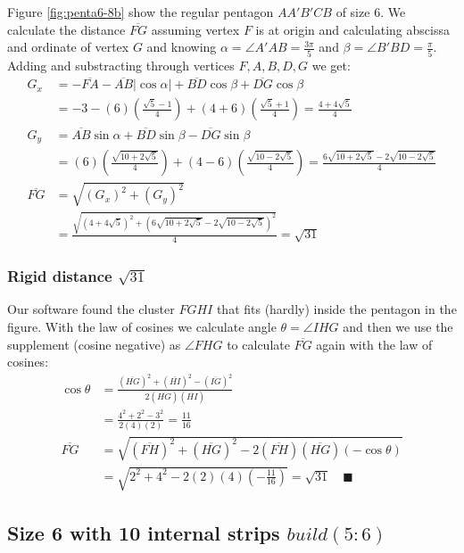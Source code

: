 \documentclass[11pt]{article}
\begin{document}
Figure \ref{fig:penta6-8b} show the regular pentagon $AA'B'CB$ of size $6$. We calculate the distance $\overline{FG}$ assuming vertex $F$ is at origin and calculating abscissa and ordinate of vertex $G$ and knowing $\alpha = \angle{A'AB} = \frac{3\pi}5$ and $\beta = \angle{B'BD} = \frac{\pi}5$. Adding and substracting through vertices $F,A,B,D,G$ we get:
\begin{align}
G_x &= -\overline{FA} -\overline{AB}|\cos\alpha| + \overline{BD}\cos\beta + \overline{DG}\cos\beta \nonumber\\
 &= -3 -(6)\left(\frac{\sqrt5 - 1}4\right) + (4+6)\left(\frac{\sqrt5+1}4\right)
 = \frac{4 + 4\sqrt5}4 \\
G_y &= \overline{AB}\sin\alpha + \overline{BD}\sin\beta - \overline{DG}\sin\beta \nonumber\\
 &= (6)\left(\frac{\sqrt{10+2\sqrt5}}4\right) + (4-6)\left(\frac{\sqrt{10-2\sqrt5}}4\right)
 = \frac{6\sqrt{10+2\sqrt5} - 2\sqrt{10-2\sqrt5}}4 \\
%
\overline{FG} &= \sqrt{(G_x)^2 + (G_y)^2} \nonumber\\
 &= \frac{\sqrt{(4+4\sqrt5)^2 + (6\sqrt{10+2\sqrt5} -2\sqrt{10-2\sqrt5})^2}}4
 = \sqrt{31}
\end{align}

\subsubsection{Rigid distance $\sqrt{31}$}

Our software found the cluster $FGHI$ that fits (hardly) inside the pentagon in the figure.
With the law of cosines we calculate angle $\theta = \angle{IHG}$ and then we use the supplement (cosine negative) as $\angle{FHG}$ to calculate $\overline{FG}$ again with the law of cosines:
\begin{align}
\cos\theta &= \frac{(\overline{HG})^2 + (\overline{HI})^2 - (\overline{IG})^2}
 {2(\overline{HG})(\overline{HI})} \nonumber\\
 &= \frac{4^2 + 2^2 - 3^2}{2(4)(2)} = \frac{11}{16} \\
\overline{FG} &= \sqrt{(\overline{FH})^2 + (\overline{HG})^2 
 - 2(\overline{FH})(\overline{HG})(-\cos\theta) } \nonumber\\
 &= \sqrt{2^2 + 4^2 - 2(2)(4)\left(-\frac{11}{16}\right)}
 = \sqrt{31} \quad \blacksquare
\end{align}


\subsection{Size 6 with 10 internal strips $build(5:6)$}
\end{document}
